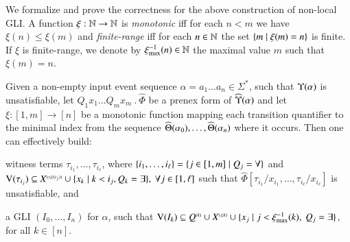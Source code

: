We formalize and prove the correctness for the above construction of
non-local GLI. A function $\xi : {\bf \mathbb{N}} \rightarrow {\bf \mathbb{N}}$ is
\emph{monotonic} iff for each $n < m$ we have $\xi(n) \leq \xi(m)$ and
\emph{finite-range} iff for each $n \in {\bf \mathbb{N}}$ the set $\{ m \mid
  \xi(m)=n \}$ is finite. If $\xi$ is finite-range, we denote by
$\xi_{\max}^{-1}(n) \in {\bf \mathbb{N}}$ the maximal value $m$ such that
$\xi(m)=n$.
\begin{lemma}\label{lemma:subst-quant}
  Given a non-empty input event sequence $\alpha = a_1 \ldots a_n \in
  \Sigma^*$, such that $\Upsilon({\alpha})$ is unsatisfiable, let
  $Q_1x_1 \ldots Q_mx_m ~.~ \widehat{\Phi}$ be a prenex form of
  $\widehat{\Upsilon}({\alpha})$ and let $\xi : [1,m] \rightarrow [n]$ be a
  monotonic function mapping each transition quantifier to the minimal
  index from the sequence $\widehat{\Theta}({\alpha_0}), \ldots,
  \widehat{\Theta}({\alpha_n})$ where it occurs. Then one can effectively build:
  \begin{compactenum}
  \item\label{it1:subst-quant} witness terms $\tau_{i_1}, \ldots,
    \tau_{i_\ell}$, where \(\{ i_1, \ldots,i_\ell \} = \{ j \in
      [1,m] \mid Q_j = \forall \}\) and \(\mathrm{V}({\tau_{i_j}}) \subseteq
    {X}^{\scriptscriptstyle{({\leq \xi(i_j)})}} \cup \{ x_k \mid k < i_j, Q_k =
      \exists \},~ \forall j \in [1,\ell]\) such that
    $\widehat{\Phi}[\tau_{i_1}/x_{i_1}, \ldots,
      \tau_{i_\ell}/x_{i_\ell}]$ is unsatisfiable, and
  \item\label{it2:subst-quant} a GLI $(I_0, \ldots, I_n)$ for
    $\alpha$, such that \(\mathrm{V}({I_k}) \subseteq {Q}^{\scriptscriptstyle{({k})}} \cup
    {X}^{\scriptscriptstyle{({\leq k})}} \cup \{ x_j \mid j < \xi_{\max}^{-1}(k),~ Q_j
      = \exists \}\), for all $k \in [n]$.
  \end{compactenum}
\end{lemma}
